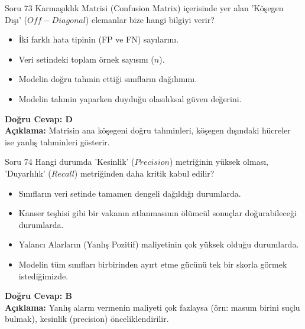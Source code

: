 \documentclass[12pt,a4paper]{article}
\begin{document}
\begin{testcard}{Soru 73}
    Karmaşıklık Matrisi (Confusion Matrix) içerisinde yer alan 'Köşegen Dışı' ($Off-Diagonal$) elemanlar bize hangi bilgiyi verir?
    \begin{itemize}
        \item[A)] İki farklı hata tipinin (FP ve FN) sayılarını.
        \item[B)] Veri setindeki toplam örnek sayısını ($n$).
        \item[C)] Modelin doğru tahmin ettiği sınıfların dağılımını.
        \item[D)] Modelin tahmin yaparken duyduğu olasılıksal güven değerini.
    \end{itemize}
    \tcblower
    \textbf{Doğru Cevap: D} \\
    \textbf{Açıklama:} Matrisin ana köşegeni doğru tahminleri, köşegen dışındaki hücreler ise yanlış tahminleri gösterir.
\end{testcard}

\begin{testcard}{Soru 74}
    Hangi durumda 'Kesinlik' ($Precision$) metriğinin yüksek olması, 'Duyarlılık' ($Recall$) metriğinden daha kritik kabul edilir?
    \begin{itemize}
        \item[A)] Sınıfların veri setinde tamamen dengeli dağıldığı durumlarda.
        \item[B)] Kanser teşhisi gibi bir vakanın atlanmasının ölümcül sonuçlar doğurabileceği durumlarda.
        \item[C)] Yalancı Alarların (Yanlış Pozitif) maliyetinin çok yüksek olduğu durumlarda.
        \item[D)] Modelin tüm sınıfları birbirinden ayırt etme gücünü tek bir skorla görmek istediğimizde.
    \end{itemize}
    \tcblower
    \textbf{Doğru Cevap: B} \\
    \textbf{Açıklama:} Yanlış alarm vermenin maliyeti çok fazlaysa (örn: masum birini suçlu bulmak), kesinlik (precision) önceliklendirilir.
\end{testcard}
\end{document}
